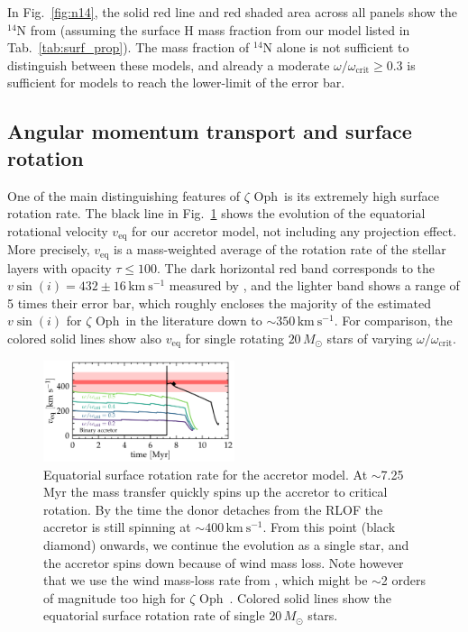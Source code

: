 \documentclass[twocolumn,twocolappendix,trackchanges]{aastex63}
\newcommand{\kms}{{\mathrm{km\ s^{-1}}}}
\DeclareRobustCommand{\Figref}[1]{Fig.~\ref{#1}}
\DeclareRobustCommand{\Tabref}[1]{Tab.~\ref{#1}}
\newcommand{\zoph}{$\zeta$ Oph}
\begin{document}
In \Figref{fig:n14}, the solid red line and red shaded area across all panels show the
$^{14}\mathrm{N}$ from  (assuming the
surface H mass fraction from our model listed in
\Tabref{tab:surf_prop}). The mass fraction of $^{14}\mathrm{N}$
alone is not sufficient to distinguish between these models, and already
a moderate $\omega/\omega_\mathrm{crit}\geq0.3$ is sufficient for
models to reach the lower-limit of the error bar.


\subsection{Angular momentum transport and surface rotation}
\label{sec:rot}

One of the main distinguishing features of \zoph\ is its extremely
high surface rotation rate.
The black line in \Figref{fig:surf_rot} shows the evolution of the
equatorial rotational velocity $v_\mathrm{eq}$ for our accretor model,
not including any projection effect. More precisely, $v_\mathrm{eq}$
is a mass-weighted average of the rotation rate of the stellar layers
with opacity $\tau\leq 100$. The dark horizontal red band corresponds
to the $v\sin(i)=432\pm16\,\kms$ measured by \cite{zehe:18}, and the
lighter band shows a range of 5 times their error bar, which roughly
encloses the majority of the estimated $v\sin(i)$ for \zoph\ in the
literature down to $\sim$$350\,\kms$.  For comparison, the colored solid lines show also
$v_\mathrm{eq}$ for single rotating $20\,M_\odot$ stars of varying
$\omega/\omega_\mathrm{crit}$.


\begin{figure}[htbp]
  \includegraphics[width=0.5\textwidth]{zeta_rot}
  \caption{Equatorial surface rotation rate for the accretor model. At
    $\sim$7.25\,Myr the mass transfer quickly spins up the accretor to
    critical rotation. By the time the donor detaches from the RLOF
    the accretor is still spinning at
    $\sim$$400\,\kms$. From this point (black diamond) onwards, we continue the evolution as a single star, and the accretor spins down because of wind mass loss.
    Note however that we use the wind mass-loss rate from \cite{vink:01}, which might be
    $\sim$2 orders of magnitude too high for \zoph\ \citep{marcolino:09}.
    Colored solid lines show the equatorial surface rotation rate of single $20\,M_\odot$ stars.
  }
  \label{fig:surf_rot}
\end{figure}
\end{document}
